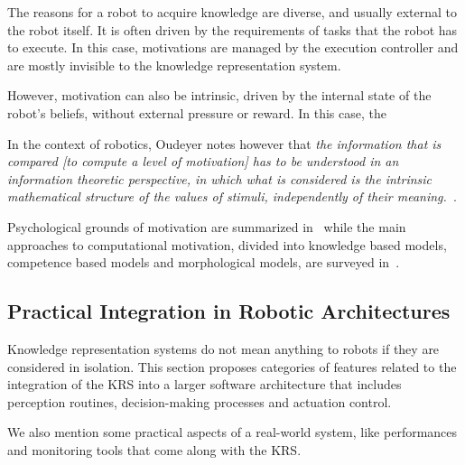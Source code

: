 The reasons for a robot to acquire knowledge are diverse, and usually external
to the robot itself. It is often driven by the requirements of tasks that the
robot has to execute. In this case, motivations are managed by the execution
controller and are mostly invisible to the knowledge representation system.

However, motivation can also be intrinsic, driven by the internal state of the
robot's beliefs, without external pressure or reward. In this case, the 

In the context of robotics, Oudeyer notes however that \emph{the information that is
compared \emph{[to compute a level of motivation]} has to be understood in an
information theoretic perspective, in which what is considered is the intrinsic
mathematical structure of the values of stimuli, independently of their
meaning.}~\cite{Oudeyer2007}.

Psychological grounds of motivation are summarized in~\cite{Oudeyer2007} while
the main approaches to computational motivation, divided into knowledge based
models, competence based models and morphological models, are surveyed
in~\cite{Oudeyer2008}.

\subsection{Practical Integration in Robotic Architectures}
\label{sect|integration-robot}

\begin{scriptsize}
\begin{center}
\end{center}
\end{scriptsize}


Knowledge representation systems do not mean anything to robots if they are
considered in isolation. This section proposes categories of features related
to the integration of the KRS into a larger software architecture that includes
perception routines, decision-making processes and actuation control.

We also mention some practical aspects of a real-world system, like
performances and monitoring tools that come along with the KRS.

